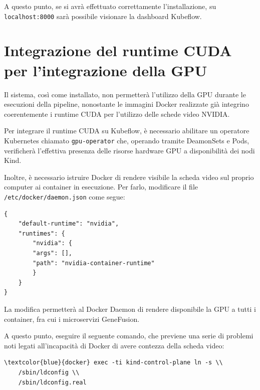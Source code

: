 A questo punto, se si avrà effettuato correttamente l'installazione, su {\small \verb|localhost:8000|} sarà possibile visionare la dashboard Kubeflow.

\section{Integrazione del runtime CUDA per l'integrazione della GPU}

Il sistema, così come installato, non permetterà l'utilizzo della GPU durante le esecuzioni della pipeline, nonostante le immagini Docker realizzate già integrino coerentemente i runtime CUDA per l'utilizzo delle schede video NVIDIA.

Per integrare il runtime CUDA su Kubeflow, è necessario abilitare un operatore Kubernetes chiamato {\small \verb|gpu-operator|} che, operando tramite DeamonSets e Pods, verificherà l'effettiva presenza delle risorse hardware GPU a disponibilità dei nodi Kind.

Inoltre, è necessario istruire Docker di rendere visibile la scheda video sul proprio computer ai container in esecuzione. Per farlo, modificare il file {\small \verb|/etc/docker/daemon.json|} come segue:

\begin{code}
\label{code:apx:a:json}
\begin{verbatim}
{
    "default-runtime": "nvidia",
    "runtimes": {
        "nvidia": {
        "args": [],
        "path": "nvidia-container-runtime"
        }
    }
}
\end{verbatim}
\end{code}

La modifica permetterà al Docker Daemon di rendere disponibile la GPU a tutti i container, fra cui i microservizi GeneFusion.

A questo punto, eseguire il seguente comando, che previene una serie di problemi noti legati all'incapacità di Docker di avere contezza della scheda video:

\begin{small}
\begin{Verbatim}[commandchars=\\\{\}]
\textcolor{blue}{docker} exec -ti kind-control-plane ln -s \\
    /sbin/ldconfig \\
    /sbin/ldconfig.real
\end{Verbatim}
\end{small}

